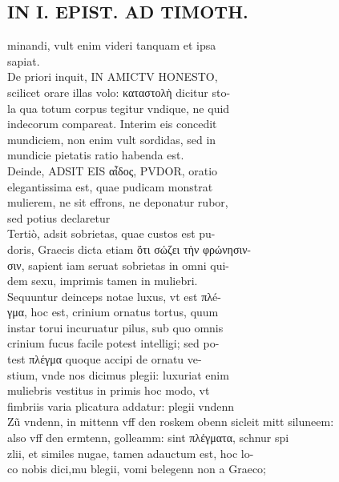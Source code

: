 \documentclass{article}
\begin{document}
\begin{pages}
\section*{IN I. EPIST. AD TIMOTH. \\
                }
minandi, vult enim videri tanquam et ipsa \\
                sapiat. \\
                De priori inquit, IN AMICTV HONESTO, \\
                scilicet orare illas volo: καταστολὴ dicitur sto- \\
                la qua totum corpus tegitur vndique, ne quid \\
                indecorum compareat. Interim eis concedit \\
                mundiciem, non enim vult sordidas, sed in \\
                mundicie pietatis ratio habenda est. \\
                Deinde, ADSIT EIS αἶδος, PVDOR, oratio \\
                elegantissima est, quae pudicam monstrat \\
                mulierem, ne sit effrons, ne deponatur rubor, \\
                sed potius declaretur \\
                Tertiò, adsit sobrietas, quae custos est pu- \\
                doris, Graecis dicta etiam ὅτι σώζει τὴν φρώνησιν- \\
                σιν, sapient iam seruat sobrietas in omni qui- \\
                dem sexu, imprimis tamen in muliebri. \\
                Sequuntur deinceps notae luxus, vt est πλé- \\
                γμα, hoc est, crinium ornatus tortus, quum \\
                instar torui incuruatur pilus, sub quo omnis \\
                crinium fucus facile potest intelligi; sed po- \\
                test πλέγμα quoque accipi de ornatu ve- \\
                stium, vnde nos dicimus plegii: luxuriat enim \\
                muliebris vestitus in primis hoc modo, vt \\
                fimbriis varia plicatura addatur: plegii vndenn \\
                Zũ vndenn, in mittenn vff den roskem obenn sicleit mitt siluneem: \\
                also vff den ermtenn, golleamm: sint πλέγματα, schnur spi \\
                zlii, et similes nugae, tamen adauctum est, hoc lo- \\
                co nobis dici,mu blegii, vomi belegenn non a Graeco; \\
                

\end{pages}
\end{document}

